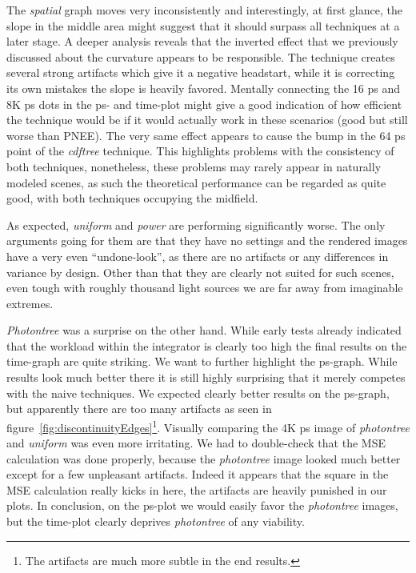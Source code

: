 The \textit{spatial} graph moves very inconsistently and interestingly, at first glance, the slope in the middle area might suggest that it should surpass all techniques at a later stage. A deeper analysis reveals that the inverted effect that we previously discussed about the curvature appears to be responsible. The technique creates several strong artifacts which give it a negative headstart, while it is correcting its own mistakes the slope is heavily favored. Mentally connecting the 16 ps and 8K ps dots in the ps- and time-plot might give a good indication of how efficient the technique would be if it would actually work in these scenarios (good but still worse than PNEE). The very same effect appears to cause the bump in the 64 ps point of the \textit{cdftree} technique. This highlights problems with the consistency of both techniques, nonetheless, these problems may rarely appear in naturally modeled scenes, as such the theoretical performance can be regarded as quite good, with both techniques occupying the midfield. 

As expected, \textit{uniform} and \textit{power} are performing significantly worse. The only arguments going for them are that they have no settings and the rendered images have a very even \enquote{undone-look}, as there are no artifacts or any differences in variance by design. Other than that they are clearly not suited for such scenes, even tough with roughly thousand light sources we are far away from imaginable extremes.

\textit{Photontree} was a surprise on the other hand. While early tests already indicated that the workload within the integrator is clearly too high the final results on the time-graph are quite striking. We want to further highlight the ps-graph. While results look much better there it is still highly surprising that it merely competes with the naive techniques. We expected clearly better results on the ps-graph, but apparently there are too many artifacts as seen in figure~\ref{fig:discontinuityEdges}\footnote{The artifacts are much more subtle in the end results.}. Visually comparing the 4K ps image of \textit{photontree} and \textit{uniform} was even more irritating. We had to double-check that the MSE calculation was done properly, because the \textit{photontree} image looked much better except for a few unpleasant artifacts. Indeed it appears that the square in the MSE calculation really kicks in here, the artifacts are heavily punished in our plots. In conclusion, on the ps-plot we would easily favor the \textit{photontree} images, but the time-plot clearly deprives \textit{photontree} of any viability.

